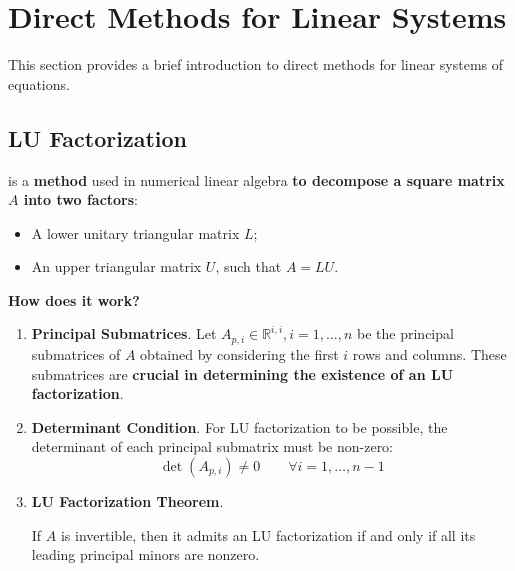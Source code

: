 \section{Direct Methods for Linear Systems}

This section provides a brief introduction to direct methods for linear systems of equations.

\subsection{LU Factorization}

 is a \textbf{method} used in numerical linear algebra \textbf{to decompose a square matrix $A$ into two factors}:
\begin{itemize}
    \item A lower unitary triangular matrix $L$;
    \item An upper triangular matrix $U$, such that $A = LU$.
\end{itemize}

\highspace
\begin{flushleft}
    \textcolor{Green3}{ \textbf{How does it work?}}
\end{flushleft}
\begin{enumerate}
    \item \textcolor{Green3}{\textbf{Principal Submatrices}}. Let $A_{p,i} \in \mathbb{R}^{i,i}, i = 1, \dots, n$ be the principal submatrices of $A$ obtained by considering the first $i$ rows and columns. These submatrices are \textbf{crucial in determining the existence of an LU factorization}.

    \item \textcolor{Green3}{\textbf{Determinant Condition}}. For LU factorization to be possible, the determinant of each principal submatrix must be non-zero:
    \begin{equation*}
        \det(A_{p,i}) \neq 0 \hspace{2em} \forall i = 1, \ldots, n-1
    \end{equation*}

    \item \textcolor{Green3}{\textbf{LU Factorization Theorem}}. \begin{theorem}
        If $A$ is invertible, then it admits an LU factorization if and only if all its leading principal minors are nonzero.
    \end{theorem}
\end{enumerate}
